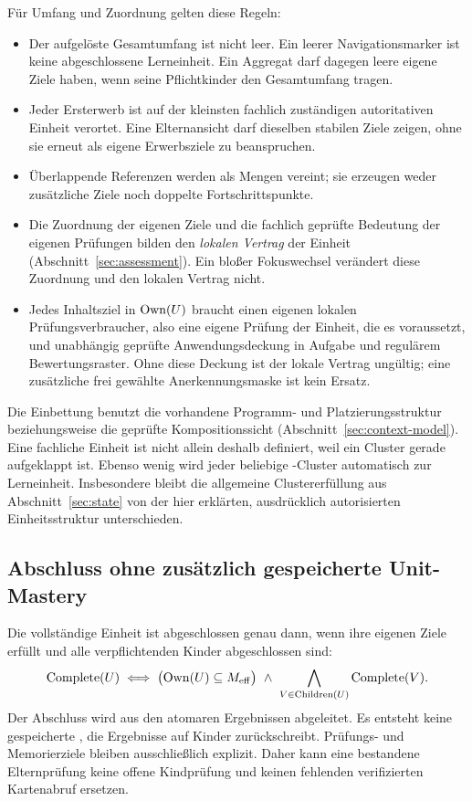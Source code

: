 Für Umfang und Zuordnung gelten diese Regeln:
\begin{itemize}
\item Der aufgelöste Gesamtumfang ist nicht leer. Ein leerer
 Navigationsmarker ist keine abgeschlossene Lerneinheit. Ein Aggregat darf
 dagegen leere eigene Ziele haben, wenn seine Pflichtkinder den
 Gesamtumfang tragen.
\item Jeder Ersterwerb ist auf der kleinsten fachlich zuständigen
 autoritativen Einheit verortet. Eine Elternansicht darf dieselben
 stabilen Ziele zeigen, ohne sie erneut als eigene Erwerbsziele zu
 beanspruchen.
\item Überlappende Referenzen werden als Mengen vereint; sie erzeugen weder
 zusätzliche Ziele noch doppelte Fortschrittspunkte.
\item Die Zuordnung der eigenen Ziele und die fachlich geprüfte Bedeutung
 der eigenen Prüfungen bilden den \emph{lokalen Vertrag} der Einheit
 (Abschnitt~\ref{sec:assessment}). Ein bloßer Fokuswechsel verändert diese
 Zuordnung und den lokalen Vertrag nicht.
\item Jedes Inhaltsziel in $\operatorname{Own}(U)$ braucht einen eigenen lokalen
 Prüfungsverbraucher, also eine eigene Prüfung der Einheit, die es
 voraussetzt, und unabhängig geprüfte Anwendungsdeckung in Aufgabe und
 regulärem Bewertungsraster. Ohne diese Deckung ist der lokale Vertrag
 ungültig; eine zusätzliche frei gewählte Anerkennungsmaske ist kein Ersatz.
\end{itemize}

Die Einbettung benutzt die vorhandene Programm- und Platzierungsstruktur
beziehungsweise die geprüfte Kompositionssicht
(Abschnitt~\ref{sec:context-model}). Eine fachliche Einheit ist nicht allein
deshalb definiert, weil ein Cluster gerade aufgeklappt ist. Ebenso wenig
wird jeder beliebige -Cluster automatisch zur Lerneinheit.
Insbesondere bleibt die allgemeine Clustererfüllung aus
Abschnitt~\ref{sec:state} von der hier erklärten, ausdrücklich autorisierten
Einheitsstruktur unterschieden.

\subsection{Abschluss ohne zusätzlich gespeicherte Unit-Mastery}
Die vollständige Einheit ist abgeschlossen genau dann, wenn ihre eigenen
Ziele erfüllt und alle verpflichtenden Kinder abgeschlossen sind:
\begin{equation}
 \operatorname{Complete}(U)\iff
 \bigl(\operatorname{Own}(U)\subseteq M_{\mathrm{eff}}\bigr)\ \land\
 \bigwedge_{V\in\operatorname{Children}(U)}\operatorname{Complete}(V).
 \label{eq:unit-complete}
\end{equation}
Der Abschluss wird aus den atomaren Ergebnissen abgeleitet. Es entsteht
keine gespeicherte \code{UnitMastery}, die Ergebnisse auf Kinder
zurückschreibt. Prüfungs- und Memorierziele bleiben ausschließlich
explizit. Daher kann eine bestandene Elternprüfung keine offene Kindprüfung
und keinen fehlenden verifizierten Kartenabruf ersetzen.

